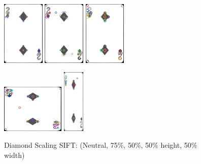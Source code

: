 \documentclass[conference]{IEEEtran}
\begin{document}
\begin{figure}[H]
    \centerline{
        {\includegraphics[width=20mm, scale=0.5]{./figures/SIFT/diamondNeutral SIFT.png}}
        {\includegraphics[width=20mm, scale=0.5]{./figures/SIFT/diamond75 SIFT.png}}
        {\includegraphics[width=20mm, scale=0.5]{./figures/SIFT/diamond50 SIFT.png}}
    }
    \centerline{
        {\includegraphics[width=30mm, scale=0.5]{./figures/SIFT/diamondheightReduced SIFT.png}}
        {\includegraphics[width=10mm, scale=0.5]{./figures/SIFT/diamondwidthReduced SIFT.png}}
    }
    \caption{Diamond Scaling SIFT: (Neutral, 75\%, 50\%, 50\% height, 50\% width)}
    \label{fig}
\end{figure}
\end{document}

